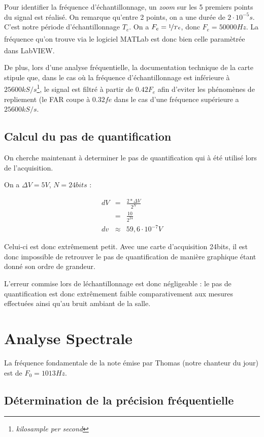 \documentclass[11pt,a4paper]{article}
\begin{document}
Pour identifier la fréquence d'échantillonnage, un \textit{zoom} sur les 5 premiers points du signal est réalisé. On remarque qu'entre 2 points, on a une durée de $2 \cdot 10^{-5}s$.
C'est notre période d'échantillonnage $T_e$. On a $F_e = \nicefrac{1}{Te}$, donc $F_e = 50000 Hz$. La fréquence qu'on
trouve via le logiciel MATLab\textsuperscript{\textregistered} est donc bien celle paramètrée dans LabVIEW\textsuperscript{\textregistered}.

De plus, lors d'une analyse fréquentielle, la documentation technique de la carte stipule que, dans le cas où la
fréquence d'échantillonnage est inférieure à $25 600kS/s$\footnote{\textit{kilosample per second}}, le signal est filtré
à partir de $0.42F_e$ afin d'eviter les phénomènes de repliement (le FAR coupe à $0.32fe$ dans le cas d'une fréquence
supérieure a $25 600kS/s$.


\subsection{Calcul du pas de quantification}

On cherche maintenant à determiner le pas de quantification qui à été utilisé lors de l'acquisition.

On a $\Delta V=5V$, $N = 24 bits$ :

\begin{eqnarray*}
dV & = & \frac{2*\Delta V}{2^N} \\
   & = &  \frac{10}{2^{24}} \\
dv & \approx & 59,6 \cdot 10^{-7} V
\end{eqnarray*}

Celui-ci est donc extrêmement petit.
Avec une carte d'acquisition 24bits, il est donc impossible de retrouver le pas de quantification de manière graphique étant donné son ordre de grandeur.

L'erreur commise lors de léchantillonnage est donc négligeable : le pas de quantification est donc extrêmement faible
comparativement aux mesures effectuées ainsi qu'au bruit ambiant de la salle.

\section{Analyse Spectrale}


La fréquence fondamentale de la note émise par Thomas (notre chanteur du jour) est de $F_0=1013Hz$.

\subsection{Détermination de la précision fréquentielle}
\end{document}
